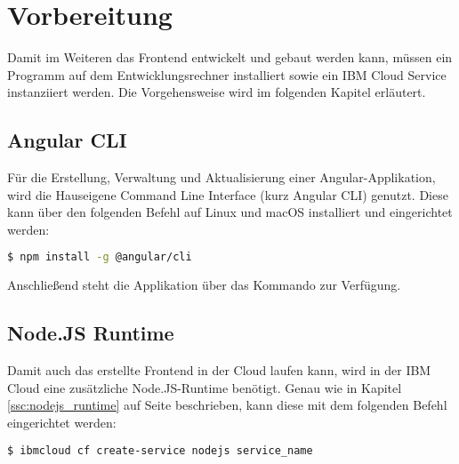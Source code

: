 \section{Vorbereitung}
Damit im Weiteren das Frontend entwickelt und gebaut werden kann, müssen ein Programm auf dem Entwicklungsrechner
installiert sowie ein IBM Cloud Service instanziiert werden. Die Vorgehensweise wird im folgenden Kapitel erläutert.

\subsection{Angular CLI}
Für die Erstellung, Verwaltung und Aktualisierung einer Angular-Applikation, wird die Hauseigene Command Line Interface
(kurz Angular CLI) genutzt. Diese kann über den folgenden Befehl auf Linux und macOS installiert und eingerichtet werden:

\begin{lstlisting}[language=bash, caption=Installation Angular CLI, label=Installation Angular CLI]
$ npm install -g @angular/cli
\end{lstlisting}

Anschließend steht die Applikation über das Kommando  zur Verfügung.

\subsection{Node.JS Runtime}
Damit auch das erstellte Frontend in der Cloud laufen kann, wird in der IBM Cloud eine zusätzliche Node.JS-Runtime
benötigt. Genau wie in Kapitel \ref{ssc:nodejs_runtime} auf Seite \pageref{ssc:nodejs_runtime} beschrieben, kann diese
mit dem folgenden Befehl eingerichtet werden:

\begin{lstlisting}[language=bash, caption=Instanziierung der Node.JS Runtime, label=Instanziierung der Node.JS Runtime]
$ ibmcloud cf create-service nodejs service_name
\end{lstlisting}